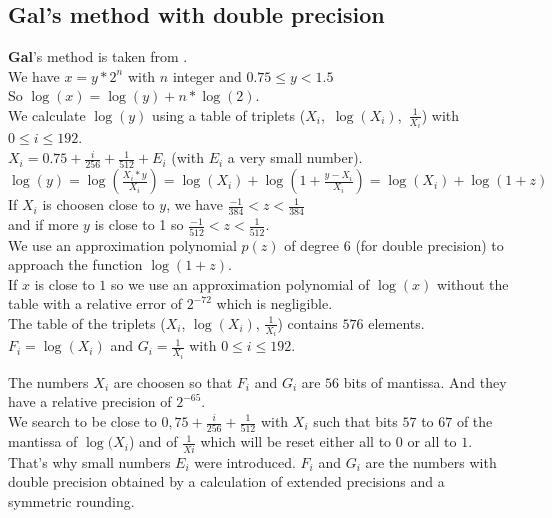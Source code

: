 \subsection{\textbf{Gal}'s method with double precision}
\textbf{Gal}'s method is taken from \cite{gal1986computing}.\\
We have $x = y*2^n$ with $n$ integer and $0.75 \le y <1.5$\\ 
So  $\log(x) = \log(y)+n*\log(2)$.\\
We calculate $\log(y)$ using a table of triplets ($X_i$,\ $\log(X_i)$,\ $\frac{1}{X_i}$) with $0 \le i \le 192$.\\
$X_i = 0.75 + \frac{i}{256}+ \frac{1}{512} + E_i$ (with $E_i$ a very small number).\\
$\log(y) = \log(\frac{X_i*y}{X_i})  = \log(X_i)+\log(1+\frac{y-X_i}{X_i})= \log(X_i) + \log(1+z)$\\
If $X_i$ is choosen close to $y$, we have $\frac{-1}{384} < z < \frac{1}{384}$\\
and if more $y$ is close to 1 so $\frac{-1}{512} < z < \frac{1}{512}$.\\
We use an approximation polynomial $p(z)$ of degree $6$ (for double precision) to approach the function $\log(1+z)$.\\
If $x$ is close to $1$ so we use an approximation polynomial of $\log(x)$ without the table with a relative error of $2^{-72}$ which is negligible.\\
The table of the triplets ($X_i$, $\log(X_i)$, $\frac{1}{X_i}$) contains $576$ elements.\\
$F_i = \log(X_i)$ and $G_i = \frac{1}{X_i}$ with $0 \le i \le 192$.

The numbers $X_i$ are choosen so that $F_i$ and $G_i$ are $56$ bits of mantissa. And they have a relative precision of $2^{-65}$.\\
We search to be close to $0,75 +\frac{i}{256} + \frac{1}{512}$ with $X_i$ such that bits $57$ to $67$ of the mantissa of $\log(X_i$) and of $\frac{1}{Xi}$ which will be reset either all to $0$ or all to $1$. That's why small numbers $E_i$ were introduced. $F_i$ and $G_i$ are  the numbers with double precision obtained by a calculation of extended precisions and a symmetric rounding. 

